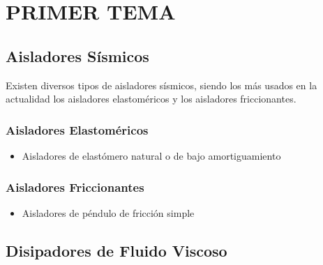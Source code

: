 \section{PRIMER TEMA}
	\subsection{Aisladores Sísmicos}

Existen diversos tipos de aisladores sísmicos, siendo los más usados en la actualidad los aisladores elastoméricos y los aisladores friccionantes.

	\subsubsection{Aisladores Elastoméricos}
\begin{itemize}

\item Aisladores de elastómero natural o de bajo amortiguamiento


\end{itemize}

		\subsubsection{Aisladores Friccionantes}
\begin{itemize}

\item Aisladores de péndulo de fricción simple


\end{itemize}



	
	\subsection{Disipadores de Fluido Viscoso}

	
	
